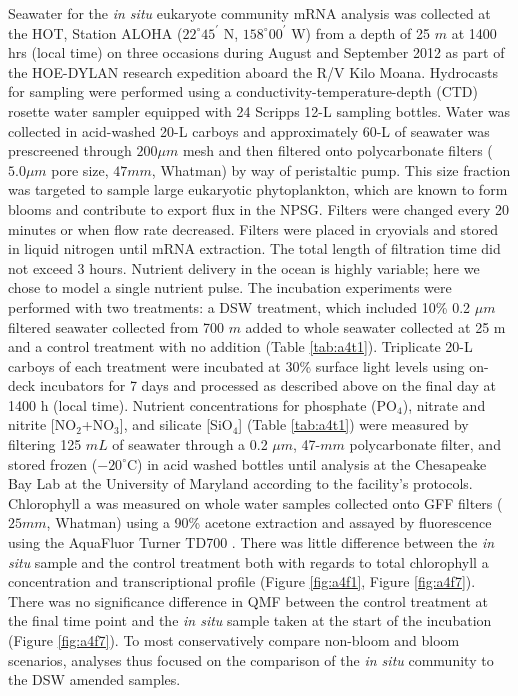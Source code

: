 Seawater for the \textit{in situ} eukaryote community mRNA analysis was collected at the HOT, Station ALOHA ($22^\circ 45^\prime$ N, $158^\circ 00^\prime$ W) from a depth of 25 $m$ at 1400 hrs (local time) on three occasions during August and September 2012 as part of the HOE-DYLAN research expedition aboard the R/V Kilo Moana. Hydrocasts for sampling were performed using a conductivity-temperature-depth (CTD) rosette water sampler equipped with 24 Scripps 12-L sampling bottles. Water was collected in acid-washed 20-L carboys and approximately 60-L of seawater was prescreened through $200 \mu m$ mesh and then filtered onto polycarbonate filters ($5.0 \mu m$ pore size, $47 mm$, Whatman) by way of peristaltic pump. This size fraction was targeted to sample large eukaryotic phytoplankton, which are known to form blooms and contribute to export flux in the NPSG. Filters were changed every 20 minutes or when flow rate decreased. Filters were placed in cryovials and stored in liquid nitrogen until mRNA extraction. The total length of filtration time did not exceed 3 hours. Nutrient delivery in the ocean is highly variable; here we chose to model a single nutrient pulse. The incubation experiments were performed with two treatments: a DSW treatment, which included 10\% 0.2 $\mu m$ filtered seawater collected from 700 $m$ added to whole seawater collected at 25 m and a control treatment with no addition (Table \ref{tab:a4t1}). Triplicate 20-L carboys of each treatment were incubated at 30\% surface light levels using on-deck incubators for 7 days and processed as described above on the final day at 1400 h (local time). Nutrient concentrations for phosphate (PO$_4$), nitrate and nitrite [NO$_2$+NO$_3$], and silicate [SiO$_4$] (Table \ref{tab:a4t1}) were measured by filtering 125 $mL$ of seawater through a 0.2 $\mu m$, 47-$mm$ polycarbonate filter, and stored frozen ($−20^\circ$C) in acid washed bottles until analysis at the Chesapeake Bay Lab at the University of Maryland according to the facility’s protocols. Chlorophyll a was measured on whole water samples collected onto GF\/F filters ($25 mm$, Whatman) using a 90\% acetone extraction and assayed by fluorescence using the AquaFluor Turner TD700 \citep{Parsons1984}. There was little difference between the \textit{in situ} sample and the control treatment both with regards to total chlorophyll a concentration and transcriptional profile (Figure \ref{fig:a4f1}, Figure \ref{fig:a4f7}).  There was no significance difference in QMF between the control treatment at the final time point and the \textit{in situ} sample taken at the start of the incubation (Figure \ref{fig:a4f7}). To most conservatively compare non-bloom and bloom scenarios, analyses thus focused on the comparison of the \textit{in situ} community to the DSW amended samples. \par

